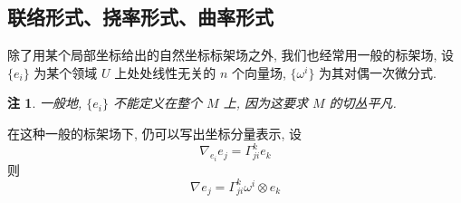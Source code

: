 \documentclass{book}
\newtheorem*{remark}{\indent 注}
\newcommand{\lc}[2]{\nabla_{#1}{#2}}
\begin{document}
    \subsection{联络形式、挠率形式、曲率形式}
        除了用某个局部坐标给出的自然坐标标架场之外, 我们也经常用一般的标架场, 设 $\{e_i\}$ 为某个领域 $U$ 上处处线性无关的 $n$ 个向量场, $\{\omega^i\}$ 为其对偶一次微分式.
        \begin{remark}
            一般地, $\{e_i\}$ 不能定义在整个 $M$ 上, 因为这要求 $M$ 的切丛平凡.
        \end{remark}
        在这种一般的标架场下, 仍可以写出坐标分量表示, 设
        \begin{equation*}
            \lc{e_i}{e_j} = \Gamma_{ji}^{k}e_k
        \end{equation*}
        则
        \begin{equation*}
            \lc{}{e_j} = \Gamma_{ji}^{k}\omega^i\otimes e_k
        \end{equation*}
\end{document}
